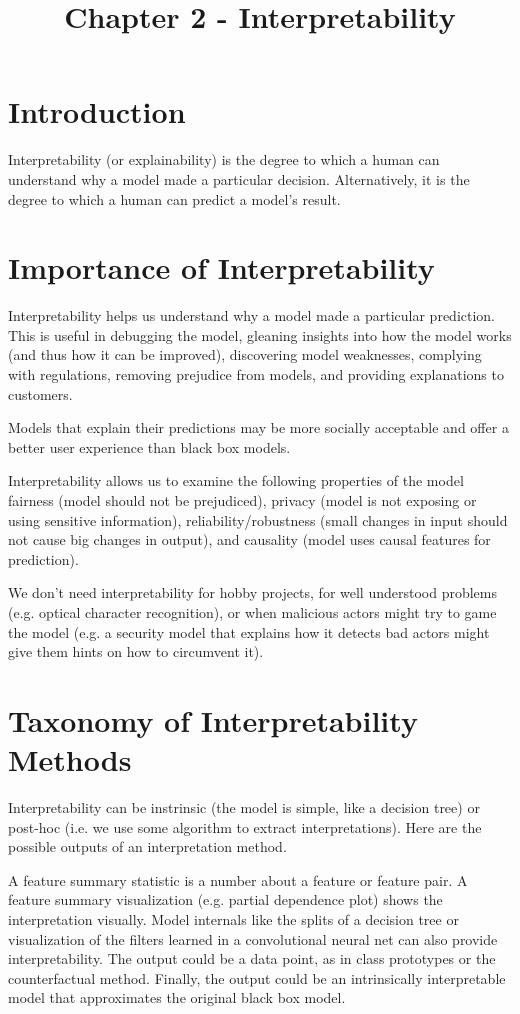 \documentclass[a4paper]{article}
\title{Chapter 2 - Interpretability}
\date{}
\begin{document}
\maketitle

\section{Introduction}
Interpretability (or explainability) is the degree to which a human can understand
why a model made a particular decision. Alternatively, it is the degree to which
a human can predict a model's result.

\section{Importance of Interpretability}
Interpretability helps us understand why a model made a particular prediction.
This is useful in debugging the model, gleaning insights into how the model
works (and thus how it can be improved), discovering model weaknesses, complying
with regulations, removing prejudice from models, and providing explanations to
customers.

Models that explain their predictions may be more socially acceptable and offer
a better user experience than black box models.

Interpretability allows us to examine the following properties of the model
fairness (model should not be prejudiced), privacy (model is not exposing
or using sensitive information), reliability/robustness (small changes in
input should not cause big changes in output), and causality (model uses causal
features for prediction).

We don't need interpretability for hobby projects, for well understood
problems (e.g. optical character recognition), or when malicious actors might
try to game the model (e.g. a security model that explains how it detects bad
actors might give them hints on how to circumvent it).

\section{Taxonomy of Interpretability Methods}
Interpretability can be instrinsic (the model is simple, like a decision tree)
or post-hoc (i.e. we use some algorithm to extract interpretations). Here are
the possible outputs of an interpretation method.

A feature summary statistic is a number about a feature or feature pair. A
feature summary visualization (e.g. partial dependence plot) shows the
interpretation visually. Model internals like the splits of a decision tree or
visualization of the filters learned in a convolutional neural net can also
provide interpretability. The output could be a data point, as in class
prototypes or the counterfactual method. Finally, the output could be an
intrinsically interpretable model that approximates the original black box
model.
\end{document}
